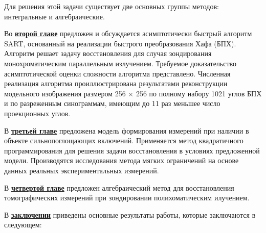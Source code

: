 Для решения этой задачи существует две основных группы методов: интегральные и алгебраические.


Во \underline{\textbf{второй главе}} предложен и обсуждается асимптотически быстрый алгоритм SART, основанный на реализации быстрого преобразования Хафа (БПХ).
Алгоритм решает задачу восстановления для случая зондирования монохроматическим параллельным излучением.
Требуемое доказательство асимптотической оценки сложности алгоритма представлено.
Численная реализация алгоритма проиллюстрирована результатами реконструкции модельного изображения размером 256 $\times$ 256 по полному набору 1021 углов БПХ и по разреженным синограммам, имеющим до 11 раз меньшее число проекционных углов.

В \underline{\textbf{третьей главе}} предложена модель формирования измерений при наличии в объекте сильнопоглощающих включений.
Применяется метод квадратичного программирования для решения задачи восстановления в условиях предложенной модели.
Производятся исследования метода мягких ограничений на основе данных реальных экспериментальных измерений.

В \underline{\textbf{четвертой главе}} предложен алгебраический метод для восстановления томографических измерений при зондировании полихоматическим илучением.

В \underline{\textbf{заключении}} приведены основные результаты работы, которые заключаются в следующем:



\begin{comment}
При использовании пакета \verb!biblatex! список публикаций автора по теме
диссертации формируется в разделе <<\publications>>\ файла
\verb!../common/characteristic.tex!  при помощи команды \verb!\nocite! 
\end{comment}

\newpage
{} %

